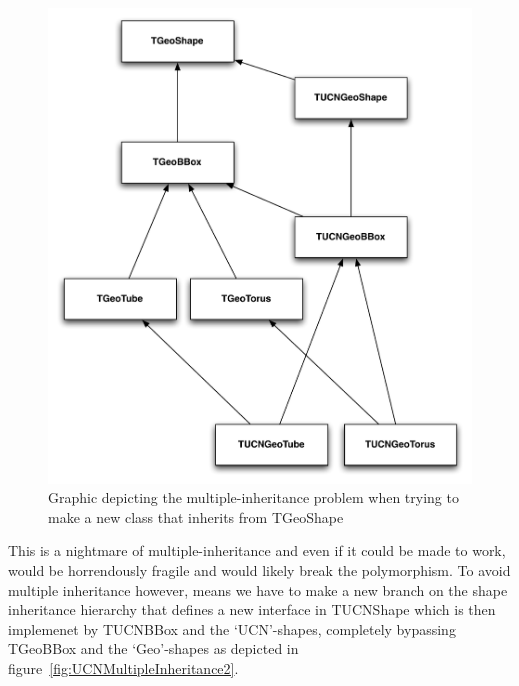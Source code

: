 \documentclass[11pt,a4paper,oneside]{article}
\begin{document}
\begin{figure}[!htbp] 
\begin{center}
\includegraphics[scale=0.5]{designdocumentimages/MultipleInheritance}
\end{center}
\caption{Graphic depicting the multiple-inheritance problem when trying to make a new class that inherits from TGeoShape}
\label{fig:UCNMultipleInheritance}
\end{figure}

This is a nightmare of multiple-inheritance and even if it could be made to work, would be horrendously fragile and would likely break the polymorphism. To avoid multiple inheritance however, means we have to make a new branch on the shape inheritance hierarchy that defines a new interface in TUCNShape which is then implemenet by TUCNBBox and the `UCN'-shapes, completely bypassing TGeoBBox and the `Geo'-shapes as depicted in figure~\ref{fig:UCNMultipleInheritance2}.
\end{document}
